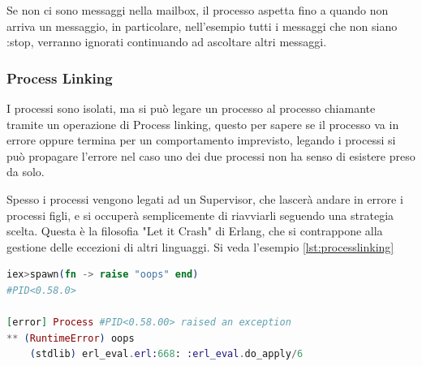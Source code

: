 Se non ci sono messaggi nella mailbox, il processo aspetta fino a
quando non arriva un messaggio, in particolare, 
nell'esempio tutti i messaggi che
non siano :stop, verranno ignorati continuando ad ascoltare altri
messaggi.

\subsubsection{Process Linking}

I processi sono isolati, ma si può legare un processo
al processo chiamante tramite un operazione di Process linking,
questo per sapere se il processo va in errore
oppure termina per un comportamento imprevisto,
legando i processi si può propagare l'errore nel caso
uno dei due processi non ha senso di esistere preso da solo.

Spesso i processi vengono legati ad un Supervisor, che
lascerà andare in errore i processi figli, e si occuperà
semplicemente di riavviarli seguendo una strategia scelta.
Questa è la filosofia "Let it Crash"
di Erlang, che si contrappone alla gestione delle eccezioni
di altri linguaggi. Si veda l'esempio \ref{lst:processlinking}

\begin{lstlisting}[language=elixir, caption={Process linking},captionpos=b,
	label={lst:processlinking}]
iex>spawn(fn -> raise "oops" end)
#PID<0.58.0>
	
[error] Process #PID<0.58.00> raised an exception
** (RuntimeError) oops
	(stdlib) erl_eval.erl:668: :erl_eval.do_apply/6
\end{lstlisting}






